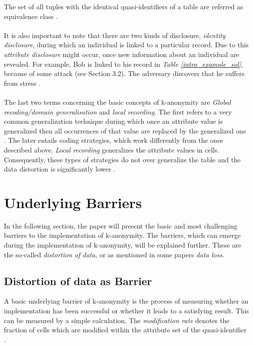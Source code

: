 \documentclass{llncs}
\begin{document}
The set of all tuples with the identical quasi-identifiers of a table are referred as equivalence class \cite{li2006achieving}.\\ \\
It is also important to note that there are two kinds of disclosure, \textit{ identity disclosure}, during which an individual is linked to a particular record. Due to this \textit{attribute disclosure} might occur, once new information about an individual are revealed. For example, Bob is linked to his record in \textit{Table \ref{intro_example_sol}}, because of some attack (see Section 3.2). The adversary discovers that he suffers from stress \cite{sweeney2002k}.\\\\
The last two terms concerning the basic concepts of k-anonymity are \textit{Global recoding/domain generalisation} and \textit{local recording}. The first refers to a very common generalization technique during which once an attribute value is generalized then all occurrences of that value are replaced by the generalized one  \cite{sweeney2002k,sweeney2002achieving,li2006achieving,incognito}. The later entails coding strategies, which work differently from the ones described above. \textit{Local recording} generalizes the attribute values in cells. Consequently, these types of strategies do not over generalize the table and the data distortion is significantly lower \cite{li2006achieving}. 
 
\section{Underlying Barriers}

In the following section, the paper will present the basic and most challenging barriers to the implementation of k-anonymity. The barriers, which can emerge during the implementation of k-anonymity, will be explained further. These are the so-called \textit{distortion of data}, or as mentioned in some papers \textit{data loss}. 
\subsection{Distortion of data as Barrier} \label{sec:Distortion of data as Barrier}

A basic underlying barrier of k-anonymity is the process of measuring whether an implementation has been successful or whether it leads to a satisfying result. This can be measured by a simple calculation. The \textit{modification rate} denotes the fraction of cells which are modified within the attribute set of the quasi-identifier \cite{li2006achieving}.
\end{document}
